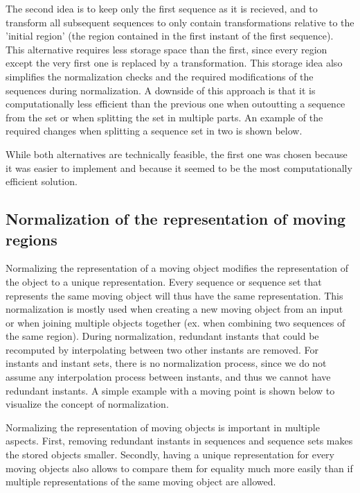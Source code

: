 		The second idea is to keep only the first sequence as it is recieved, and to transform all subsequent sequences to only contain transformations relative to the 'initial region' (the region contained in the first instant of the first sequence). This alternative requires less storage space than the first, since every region except the very first one is replaced by a transformation. This storage idea also simplifies the normalization checks and the required modifications of the sequences during normalization. A downside of this approach is that it is computationally less efficient than the previous one when outoutting a sequence from the set or when splitting the set in multiple parts. An example of the required changes when splitting a sequence set in two is shown below. 
		
		While both alternatives are technically feasible, the first one was chosen because it was easier to implement and because it seemed to be the most computationally efficient solution. 

	\subsection{Normalization of the representation of moving regions}

	Normalizing the representation of a moving object modifies the representation of the object to a unique representation. Every sequence or sequence set that represents the same moving object will thus have the same representation. This normalization is mostly used when creating a new moving object from an input or when joining multiple objects together (ex. when combining two sequences of the same region). During normalization, redundant instants that could be recomputed by interpolating between two other instants are removed. For instants and instant sets, there is no normalization process, since we do not assume any interpolation process between instants, and thus we cannot have redundant instants. A simple example with a moving point is shown below to visualize the concept of normalization.
	
	
	Normalizing the representation of moving objects is important in multiple aspects. First, removing redundant instants in sequences and sequence sets makes the stored objects smaller. Secondly, having a unique representation for every moving objects also allows to compare them for equality much more easily than if multiple representations of the same moving object are allowed.
	
